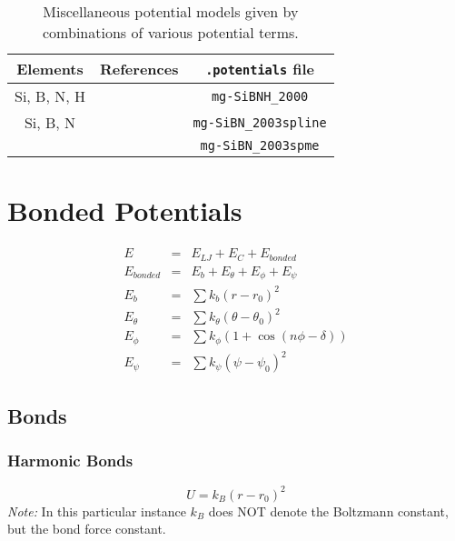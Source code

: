 \begin{table}
  \caption{Miscellaneous potential models given by combinations of various potential terms.}
  \label{tab:MiscPot}
  {\small
  \begin{center}
    \begin{tabular}{ccc}
      Elements & References & \texttt{.potentials} file \\\hline
      Si, B, N, H & \cite{marian2000systematic} & \verb+mg-SiBNH_2000+\\
      \hline
      Si, B, N & \cite{gastreich2003charged} & \verb+mg-SiBN_2003spline+\\
      &  & \verb+mg-SiBN_2003spme+\\
      \hline
    \end{tabular}
  \end{center}
}
\end{table}
 

\section{Bonded Potentials}
\begin{eqnarray*}
E &=& E_{LJ} + E_C + E_{bonded} \\
E_{bonded} &=& E_b + E_{\theta} + E_{\phi} + E_{\psi} \\
E_b &=& \sum k_b (r -r_0)^2 \\
E_{\theta} &=& \sum k_{\theta} (\theta - \theta_0)^2 \\
E_{\phi} &=& \sum k_{\phi} ( 1 + \cos (n \phi - \delta )) \\
E_{\psi} &=& \sum k_{\psi} ( \psi - \psi_0)^2
\end{eqnarray*}

\subsection{Bonds}\label{sse:bondedpotentials}
\subsubsection{Harmonic Bonds}
\begin{equation*}
U = k_B(r-r_0)^2
\end{equation*}
\emph{Note:} In this particular instance $k_B$ does NOT denote the Boltzmann constant, but the bond force constant.

